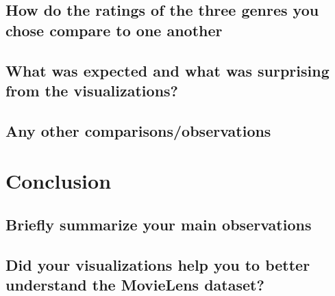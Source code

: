 \subsection{How do the ratings of the three genres you chose compare to one another}
\subsection{What was expected and what was surprising from the visualizations?}
\subsection{Any other comparisons/observations}

\section{Conclusion}
\medskip
\subsection{Briefly summarize your main observations}
\subsection{Did your visualizations help you to better understand the MovieLens dataset?}


